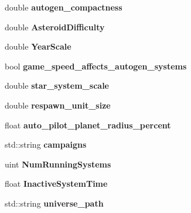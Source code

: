 \begin{DoxyCompactItemize}
\item 
double {\bfseries autogen\+\_\+compactness}\hypertarget{classvs__options_ad1a812f348cd0efcebe55c58fc21c22a}{}\label{classvs__options_ad1a812f348cd0efcebe55c58fc21c22a}

\item 
double {\bfseries Asteroid\+Difficulty}\hypertarget{classvs__options_affdaf9441523dc188be207d4c756ad95}{}\label{classvs__options_affdaf9441523dc188be207d4c756ad95}

\item 
double {\bfseries Year\+Scale}\hypertarget{classvs__options_ada4ea0f852a99a25c254810c7bb16fef}{}\label{classvs__options_ada4ea0f852a99a25c254810c7bb16fef}

\item 
bool {\bfseries game\+\_\+speed\+\_\+affects\+\_\+autogen\+\_\+systems}\hypertarget{classvs__options_afc488d53dd7de9394e8c341f56ba3047}{}\label{classvs__options_afc488d53dd7de9394e8c341f56ba3047}

\item 
double {\bfseries star\+\_\+system\+\_\+scale}\hypertarget{classvs__options_af4878dbc63ee80222ad7718bf51797fa}{}\label{classvs__options_af4878dbc63ee80222ad7718bf51797fa}

\item 
double {\bfseries respawn\+\_\+unit\+\_\+size}\hypertarget{classvs__options_af05320efd16818f8534b0cd9cf8116bc}{}\label{classvs__options_af05320efd16818f8534b0cd9cf8116bc}

\item 
float {\bfseries auto\+\_\+pilot\+\_\+planet\+\_\+radius\+\_\+percent}\hypertarget{classvs__options_a11ab3d6c08976b7f66201c978ad6e377}{}\label{classvs__options_a11ab3d6c08976b7f66201c978ad6e377}

\item 
std\+::string {\bfseries campaigns}\hypertarget{classvs__options_afabc94047eed4bf5bae30b94f0b91128}{}\label{classvs__options_afabc94047eed4bf5bae30b94f0b91128}

\item 
uint {\bfseries Num\+Running\+Systems}\hypertarget{classvs__options_abc610a9889df7508d2365c59a5261824}{}\label{classvs__options_abc610a9889df7508d2365c59a5261824}

\item 
float {\bfseries Inactive\+System\+Time}\hypertarget{classvs__options_aeff81bff53d1338130d23ddda5bee62a}{}\label{classvs__options_aeff81bff53d1338130d23ddda5bee62a}

\item 
std\+::string {\bfseries universe\+\_\+path}\hypertarget{classvs__options_a8133acada447894c541a2f87cec7f6c6}{}\label{classvs__options_a8133acada447894c541a2f87cec7f6c6}


\end{DoxyCompactItemize}
